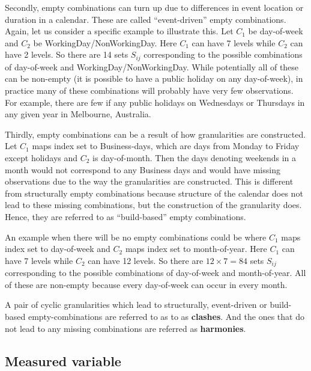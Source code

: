 \documentclass[12pt]{article}
\begin{document}
Secondly, empty combinations can turn up due to differences in event location or duration in a calendar. These are called ``event-driven'' empty combinations. Again, let us consider a specific example to illustrate this. Let \(C_1\) be day-of-week and \(C_2\) be WorkingDay/NonWorkingDay. Here \(C_1\) can have 7 levels while \(C_2\) can have 2 levels. So there are 14 sets \(S_{ij}\) corresponding to the possible combinations of day-of-week and WorkingDay/NonWorkingDay. While potentially all of these can be non-empty (it is possible to have a public holiday on any day-of-week), in practice many of these combinations will probably have very few observations. For example, there are few if any public holidays on Wednesdays or Thursdays in any given year in Melbourne, Australia.

Thirdly, empty combinations can be a result of how granularities are constructed. Let \(C_1\) maps index set to Business-days, which are days from Monday to Friday except holidays and \(C_2\) is day-of-month. Then the days denoting weekends in a month would not correspond to any Business days and would have missing observations due to the way the granularities are constructed. This is different from structurally empty combinations because structure of the calendar does not lead to these missing combinations, but the construction of the granularity does. Hence, they are referred to as ``build-based'' empty combinations.

An example when there will be no empty combinations could be where \(C_1\) maps index set to day-of-week and \(C_2\) maps index set to month-of-year. Here \(C_1\) can have 7 levels while \(C_2\) can have 12 levels. So there are \(12\times7=84\) sets \(S_{ij}\) corresponding to the possible combinations of day-of-week and month-of-year. All of these are non-empty because every day-of-week can occur in every month.

A pair of cyclic granularities which lead to structurally, event-driven or build-based empty-combinations are referred to as to as \textbf{clashes}. And the ones that do not lead to any missing combinations are referred as \textbf{harmonies}.

\hypertarget{sec:measured-variable}{%
\subsection{Measured variable}\label{sec:measured-variable}}
\end{document}
